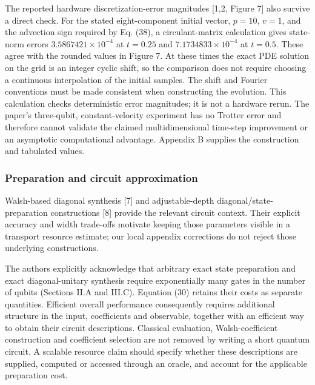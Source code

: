 The reported hardware discretization-error magnitudes {[}1,2, Figure
7{]} also survive a direct check. For the stated eight-component initial
vector, \(p=10\), \(v=1\), and the advection sign required by Eq. (38),
a circulant-matrix calculation gives state-norm errors
\(3.5867421\times10^{-4}\) at \(t=0.25\) and \(7.1734833\times10^{-4}\)
at \(t=0.5\). These agree with the rounded values in Figure 7. At these
times the exact PDE solution on the grid is an integer cyclic shift, so
the comparison does not require choosing a continuous interpolation of
the initial samples. The shift and Fourier conventions must be made
consistent when constructing the evolution. This calculation checks
deterministic error magnitudes; it is not a hardware rerun. The paper's
three-qubit, constant-velocity experiment has no Trotter error and
therefore cannot validate the claimed multidimensional time-step
improvement or an asymptotic computational advantage. Appendix B
supplies the construction and tabulated values.

\subsubsection{Preparation and circuit
approximation}\label{preparation-and-circuit-approximation}

Walsh-based diagonal synthesis {[}7{]} and adjustable-depth
diagonal/state-preparation constructions {[}8{]} provide the relevant
circuit context. Their explicit accuracy and width trade-offs motivate
keeping those parameters visible in a transport resource estimate; our
local appendix corrections do not reject those underlying constructions.

The authors explicitly acknowledge that arbitrary exact state
preparation and exact diagonal-unitary synthesis require exponentially
many gates in the number of qubits (Sections II.A and III.C). Equation
(30) retains their costs as separate quantities. Efficient overall
performance consequently requires additional structure in the input,
coefficients and observable, together with an efficient way to obtain
their circuit descriptions. Classical evaluation, Walsh-coefficient
construction and coefficient selection are not removed by writing a
short quantum circuit. A scalable resource claim should specify whether
these descriptions are supplied, computed or accessed through an oracle,
and account for the applicable preparation cost.

